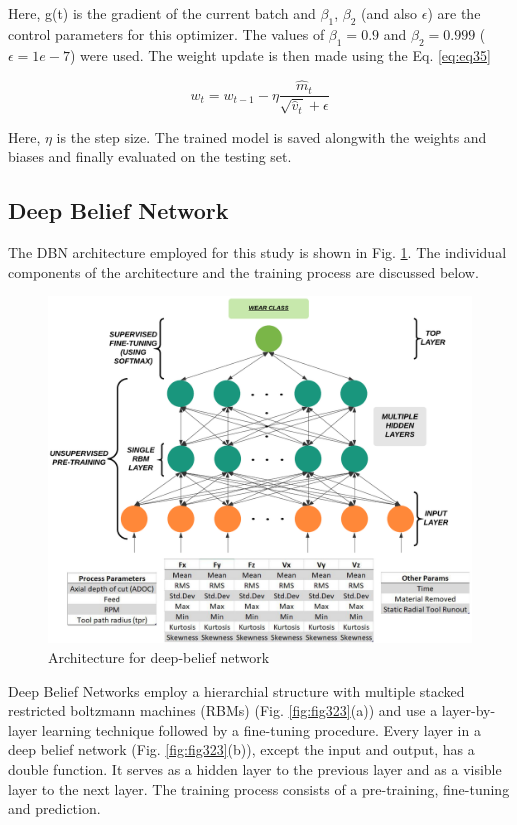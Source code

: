 \documentclass[preprint,review,12pt]{elsarticle}
\begin{document}
Here, g(t) is the gradient of the current batch and $\beta_1$, $\beta_2$ (and also $\epsilon$) are the control parameters for this optimizer. The values of $\beta_1 = 0.9$ and $\beta_2 = 0.999$ ($\epsilon = 1e-7$) were used. The weight update is then made using the Eq. \ref{eq:eq35} \par

\begin{equation}\label{eq:eq35}
  w_t = w_{t-1} - \eta\frac{\hat m_t}{\sqrt{\hat v_t}+\epsilon}
\end{equation}

Here, $\eta$ is the step size. The trained model is saved alongwith the weights and biases and finally evaluated on the testing set.

\subsection{Deep Belief Network}\label{sec:sec42}
The DBN architecture employed for this study is shown in Fig. \ref{fig:fig324}. The individual components of the architecture and the training process are discussed below.

\begin{figure}[!h]
  \begin{center}
    \includegraphics[width=0.75\linewidth]{324.png}
    \caption{Architecture for deep-belief network}\label{fig:fig324}
  \end{center}
\end{figure}

Deep Belief Networks employ a hierarchial structure with multiple stacked restricted boltzmann machines (RBMs) (Fig. \ref{fig:fig323}(a)) and use a layer-by-layer learning technique followed by a fine-tuning procedure. Every layer in a deep belief network (Fig. \ref{fig:fig323}(b)), except the input and output, has a double function. It serves as a hidden layer to the previous layer and as a visible layer to the next layer. The training process consists of a pre-training, fine-tuning and prediction. \par
\end{document}
